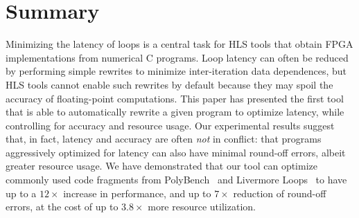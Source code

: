 \section{Summary}
\label{lo:sec:conclusion}

Minimizing the latency of loops is a central task for HLS tools that obtain
FPGA implementations from numerical C programs. Loop latency can often be
reduced by performing simple rewrites to minimize inter-iteration data
dependences, but HLS tools cannot enable such rewrites by default because
they may spoil the accuracy of floating-point computations. This paper has
presented the first tool that is able to automatically rewrite a given program
to optimize latency, while controlling for accuracy and resource usage. Our
experimental results suggest that, in fact, latency and accuracy are often
\emph{not} in conflict: that programs aggressively optimized for latency can
also have minimal round-off errors, albeit greater resource usage. We have
demonstrated that our tool can optimize commonly used code fragments from
PolyBench~\cite{polybench} and Livermore Loops~\cite{livermore} to have up to a
$12\times$ increase in performance, and up to $7\times$ reduction of round-off
errors, at the cost of up to $3.8\times$ more resource utilization.

